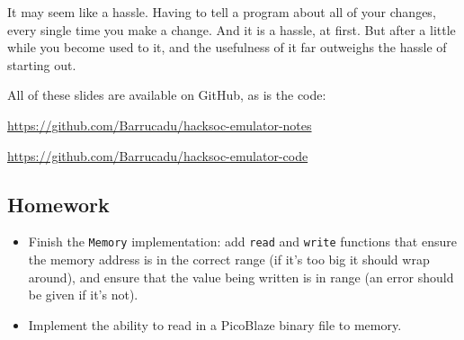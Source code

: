 \documentclass[12pt,a4paper]{article}
\begin{document}
It may seem like a hassle. Having to tell a program about all of your
changes, every single time you make a change. And it is a hassle, at
first. But after a little while you become used to it, and the
usefulness of it far outweighs the hassle of starting out.

All of these slides are available on GitHub, as is the code:

\url{https://github.com/Barrucadu/hacksoc-emulator-notes}

\url{https://github.com/Barrucadu/hacksoc-emulator-code}

\subsection{Homework}

\begin{itemize}
  \item Finish the \texttt{Memory} implementation: add \texttt{read}
    and \texttt{write} functions that ensure the memory address is in
    the correct range (if it's too big it should wrap around), and
    ensure that the value being written is in range (an error should
    be given if it's not).

  \item Implement the ability to read in a PicoBlaze binary file to
    memory.
\end{itemize}
\end{document}
